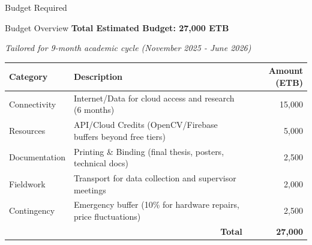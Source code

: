 \begin{frame}{Budget Required}
    \begin{block}{Budget Overview}
        \textbf{Total Estimated Budget: 27,000 ETB}
        
        \textit{Tailored for 9-month academic cycle (November 2025 - June 2026)}
    \end{block}
    
    \begin{table}[]
        \centering
        \small
        \begin{tabular}{|l|p{5.5cm}|r|}
            \hline
            \textbf{Category} & \textbf{Description} & \textbf{Amount (ETB)} \\
            \hline
            Connectivity & Internet/Data for cloud access and research (6 months) & 15,000 \\
            \hline
            Resources & API/Cloud Credits (OpenCV/Firebase buffers beyond free tiers) & 5,000 \\
            \hline
            Documentation & Printing \& Binding (final thesis, posters, technical docs) & 2,500 \\
            \hline
            Fieldwork & Transport for data collection and supervisor meetings & 2,000 \\
            \hline
            Contingency & Emergency buffer (10\% for hardware repairs, price fluctuations) & 2,500 \\
            \hline
            \multicolumn{2}{|r|}{\textbf{Total}} & \textbf{27,000} \\
            \hline
        \end{tabular}
    \end{table}
\end{frame}

